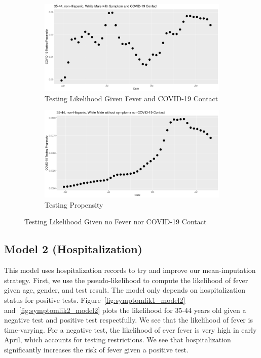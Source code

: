 \documentclass[11pt]{amsart}
\numberwithin{equation}{section}
\theoremstyle{plain}
\begin{document}
\begin{figure}[!th]
\centering
\begin{subfigure}{.5\textwidth}
 \centering
 \includegraphics[width=.9\linewidth]{../figs/tvprop_fig1.png}
 \caption{Testing Likelihood Given Fever and COVID-19 Contact}
 \label{fig:testinglik1}
\end{subfigure}%
\begin{subfigure}{.5\textwidth}
 \centering
\includegraphics[width=.9\linewidth]{../figs/tvprop_fig2.png}
 \caption{Testing Propensity}
 \label{fig:testinglik2}
\end{subfigure}
\caption{Testing Likelihood Given no Fever nor COVID-19 Contact}
\label{fig:testinglik}
\end{figure}

\newpage

\subsection{Model 2 (Hospitalization)}

This model uses hospitalization records to try and improve our mean-imputation strategy.  First, we use the pseudo-likelihood to compute the likelihood of fever given age, gender, and test result.  The model only depends on hospitalization status for positive tests.  Figure~\ref{fig:symptomlik1_model2} and~\ref{fig:symptomlik2_model2} plots the likelihood for 35-44 years old given a negative test and positive test respectfully.  We see that the likelihood of fever is time-varying.  For a negative test, the likelihood of ever fever is very high in early April, which accounts for testing restrictions. We see that hospitalization significantly increases the risk of fever given a positive test.
\end{document}
